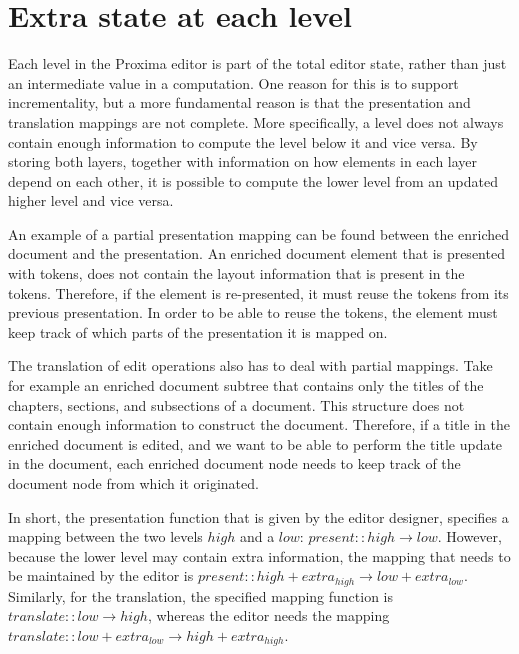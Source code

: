 %																
%																
%																
\section{Extra state at each level} \label{sect:archExtraState}

Each level in the Proxima editor is part of the total editor state, rather than just an intermediate value in a computation. One reason for this is to support incrementality, but a more fundamental reason is that the presentation and translation mappings are not complete. More specifically, a level does not always contain enough information to compute the level below it and vice versa. By storing both layers, together with information on how elements in each layer depend on each other, it is possible to compute the lower level from an updated higher level and vice versa.

An example of a partial presentation mapping can be found between the enriched document and the presentation. An enriched document element that is presented with tokens, does not contain the layout information that is present in the tokens. Therefore, if the element is re-presented, it must reuse the tokens from its previous presentation. In order to be able to reuse the tokens, the element must keep track of which parts of the presentation it is mapped on.

The translation of edit operations also has to deal with partial mappings. Take for example an enriched document subtree that contains only the titles of the chapters, sections, and subsections of a document. This structure does not contain enough information to construct the document. Therefore, if a title in the enriched document is edited, and we want to be able to perform the title update in the document, each enriched document node needs to keep track of the document node from which it originated. 

In short, the presentation function that is given by the editor designer, specifies a mapping between the two levels $high$ and a $low$:  $present :: high \rightarrow low$. However, because the lower level may contain extra information, the mapping that needs to be maintained by the editor is 
$present :: high+extra_{high} \rightarrow low+extra_{low}$. Similarly, for the translation, the specified mapping function is 
$translate :: low \rightarrow high$, whereas the editor needs the mapping 
$translate :: low+extra_{low} \rightarrow high+extra_{high}$. 

